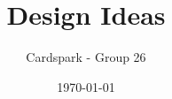 \documentclass{article}
\begin{document}
\title{Design Ideas}
\author{Cardspark - Group 26}
\date{\today}
\maketitle 
\end{document}
